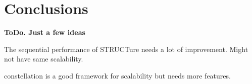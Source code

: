 \chapter{Conclusions}

\textbf{ToDo. Just a few ideas}

The sequential performance of STRUCTure needs
a lot of improvement. Might not have same scalability.

constellation is  a good framework for scalability
but needs more features.
